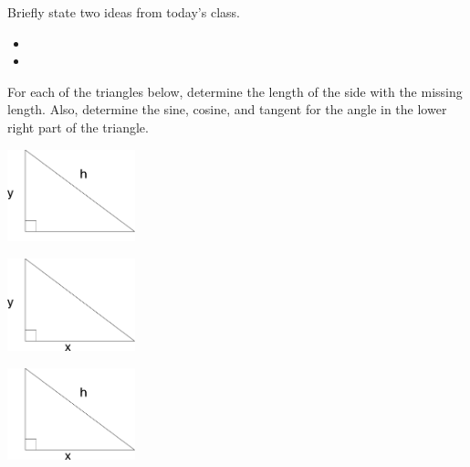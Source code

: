 \postClass

\begin{problem}
\item Briefly state two ideas from today's class.
  \begin{itemize}
  \item 
  \item 
  \end{itemize}
\item 
  \begin{subproblem}
    \item
  \end{subproblem}
\end{problem}



\begin{problem}
\item For each of the triangles below, determine the length of the
  side with the missing length. Also, determine the sine, cosine, and tangent
    for the angle in the lower right part of the triangle.
  \begin{subproblem}
  \item \includegraphics[width=10em]{ink/trigSubs/triangleSymbolsLeftHyp}
    \vfill
  \item \includegraphics[width=10em]{ink/trigSubs/triangleSymbolsBottomLeft}
    \vfill
  \item \includegraphics[width=10em]{ink/trigSubs/triangleSymbolsBottomHyp}
    \vfill
  \end{subproblem}
\end{problem}



